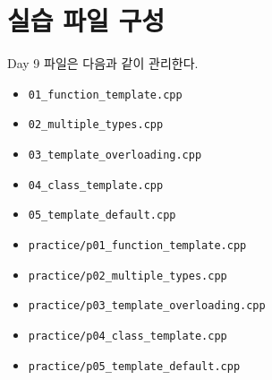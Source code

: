 \documentclass[11pt,a4paper]{article}
\begin{document}
\section{실습 파일 구성}
\begin{practicebox}
Day 9 파일은 다음과 같이 관리한다.
\begin{itemize}[leftmargin=1.5em]
    \item \texttt{01\_function\_template.cpp}
    \item \texttt{02\_multiple\_types.cpp}
    \item \texttt{03\_template\_overloading.cpp}
    \item \texttt{04\_class\_template.cpp}
    \item \texttt{05\_template\_default.cpp}
    \item \texttt{practice/p01\_function\_template.cpp}
    \item \texttt{practice/p02\_multiple\_types.cpp}
    \item \texttt{practice/p03\_template\_overloading.cpp}
    \item \texttt{practice/p04\_class\_template.cpp}
    \item \texttt{practice/p05\_template\_default.cpp}
\end{itemize}
\end{practicebox}
\end{document}
